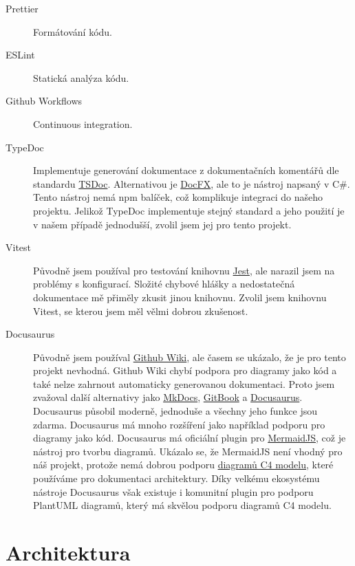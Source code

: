 \begin{description}
    \item[Prettier]
    Formátování kódu.
    \item[ESLint]
    Statická analýza kódu.
    \item[Github Workflows]
    Continuous integration.
    \item[TypeDoc]
    Implementuje generování dokumentace z dokumentačních komentářů dle standardu \href{https://tsdoc.org/}{TSDoc}.
    Alternativou je \href{https://github.com/dotnet/docfx}{DocFX}, ale to je nástroj napsaný v C\#.
    Tento nástroj nemá npm balíček, což komplikuje integraci do našeho projektu.
    Jelikož TypeDoc implementuje stejný standard a jeho použití je v našem případě jednodušší, zvolil jsem jej pro tento projekt.
    \item[Vitest]
    Původně jsem používal pro testování knihovnu \href{https://jestjs.io/}{Jest}, ale narazil jsem na problémy s konfigurací.
    Složité chybové hlášky a nedostatečná dokumentace mě přiměly zkusit jinou knihovnu.
    Zvolil jsem knihovnu Vitest, se kterou jsem měl vělmi dobrou zkušenost.
    \item[Docusaurus]
    Původně jsem používal \href{https://docs.github.com/en/communities/documenting-your-project-with-wikis/about-wikis}{Github Wiki}, ale časem se ukázalo, že je pro tento projekt nevhodná.
    Github Wiki chybí podpora pro diagramy jako kód a také nelze zahrnout automaticky generovanou dokumentaci.
    Proto jsem zvažoval další alternativy jako \href{https://www.mkdocs.org/}{MkDocs}, \href{https://www.gitbook.com/}{GitBook} a \href{https://docusaurus.io/}{Docusaurus}.
    Docusaurus působil moderně, jednoduše a všechny jeho funkce jsou zdarma.
    Docusaurus má mnoho rozšíření jako například podporu pro diagramy jako kód.
    Docusaurus má oficiální plugin pro \href{https://mermaid.js.org/}{MermaidJS}, což je nástroj pro tvorbu diagramů.
    Ukázalo se, že MermaidJS není vhodný pro náš projekt, protože nemá dobrou podporu \href{https://c4model.com/}{diagramů C4 modelu}, které používáme pro dokumentaci architektury.
    Díky velkému ekosystému nástroje Docusaurus však existuje i komunitní plugin pro podporu PlantUML diagramů, který má skvělou podporu diagramů C4 modelu.
\end{description}


\section{Architektura}\label{sec:architektura}

